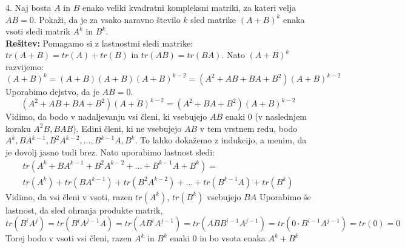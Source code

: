 \documentclass[a4paper,12pt]{article}
\begin{document}
4. Naj bosta $A$ in $B$ enako veliki kvadratni kompleksni matriki, za kateri velja $AB=0$. 
Pokaži, da je za vsako naravno število $k$ sled matrike $(A+B)^k$ enaka vsoti sledi matrik $A^k$ in $B^k$.\\
\textbf{Rešitev:}
Pomagamo si z lastnostmi sledi matrike: \\$tr(A+B) = tr(A) + tr(B)$ in $tr(AB) = tr(BA)$. Nato $(A+B)^k$ razvijemo:
\[(A+B)^k = (A+B)(A+B)(A+B)^{k-2} = (A^2 + AB + BA + B^2)(A+B)^{k-2}\] 
Uporabimo dejstvo, da je $AB = 0$.
\[(A^2 + AB + BA + B^2)(A+B)^{k-2} = (A^2 + BA + B^2)(A+B)^{k-2} \]
Vidimo, da bodo v nadaljevanju vsi členi, ki vsebujejo $AB$ enaki 0 (v naslednjem koraku $A^2B, BAB$). Edini členi, ki ne vsebujejo $AB$ v tem vrstnem redu,
bodo $A^k, BA^{k-1}, B^2A^{k-2}, \dots, B^{k-1}A, B^k $. To lahko dokažemo z indukcijo, a menim, da je dovolj jasno tudi brez.
Nato uporabimo lastnost sledi:
\begin{align*}tr(A^k+BA^{k-1}+B^2A^{k-2}+\dots+B^{k-1}A+B^k) =  \\
tr(A^k)+ tr(BA^{k-1}) +tr(B^2A^{k-2})+ \dots +tr(B^{k-1}A)+tr(B^k) 
\end{align*}
Vidimo, da vsi členi v vsoti, razen $tr(A^k)$, $tr(B^k)$ vsebujejo $BA$ Uporabimo še lastnost, da sled ohranja produkte matrik,
\[ tr(B^iA^j)= tr(B^{i}A^{j-1}A) = tr(AB^iA^{j-1} ) = tr(ABB^{i-1}A^{j-1})=tr(0 \cdot B^{i-1}A^{j-1})=tr(0)=0\] 
Torej bodo v vsoti vsi členi, razen $A^k$ in $B^k$ enaki 0 in bo vsota enaka $A^k + B^k$
\end{document}
